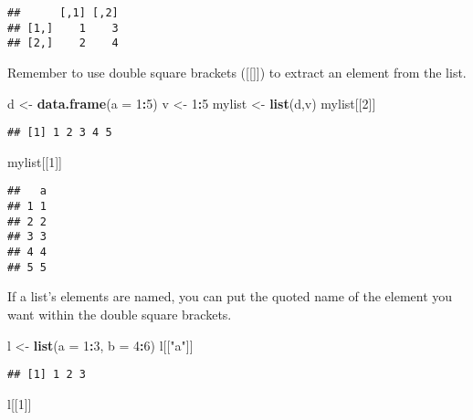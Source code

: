 \documentclass[
]{article}
\newenvironment{Shaded}{\begin{snugshade}}{\end{snugshade}}
\newcommand{\DataTypeTok}[1]{\textcolor[rgb]{0.13,0.29,0.53}{#1}}
\newcommand{\DecValTok}[1]{\textcolor[rgb]{0.00,0.00,0.81}{#1}}
\newcommand{\KeywordTok}[1]{\textcolor[rgb]{0.13,0.29,0.53}{\textbf{#1}}}
\newcommand{\NormalTok}[1]{#1}
\newcommand{\OperatorTok}[1]{\textcolor[rgb]{0.81,0.36,0.00}{\textbf{#1}}}
\newcommand{\StringTok}[1]{\textcolor[rgb]{0.31,0.60,0.02}{#1}}
\begin{document}
\begin{verbatim}
##      [,1] [,2]
## [1,]    1    3
## [2,]    2    4
\end{verbatim}

Remember to use double square brackets ({[}{[}{]}{]}) to extract an
element from the list.

\begin{Shaded}
\begin{Highlighting}[]
\NormalTok{d <-}\StringTok{ }\KeywordTok{data.frame}\NormalTok{(}\DataTypeTok{a =} \DecValTok{1}\OperatorTok{:}\DecValTok{5}\NormalTok{)}
\NormalTok{v <-}\StringTok{ }\DecValTok{1}\OperatorTok{:}\DecValTok{5}
\NormalTok{mylist <-}\StringTok{ }\KeywordTok{list}\NormalTok{(d,v)}
\NormalTok{mylist[[}\DecValTok{2}\NormalTok{]]}
\end{Highlighting}
\end{Shaded}

\begin{verbatim}
## [1] 1 2 3 4 5
\end{verbatim}

\begin{Shaded}
\begin{Highlighting}[]
\NormalTok{mylist[[}\DecValTok{1}\NormalTok{]]}
\end{Highlighting}
\end{Shaded}

\begin{verbatim}
##   a
## 1 1
## 2 2
## 3 3
## 4 4
## 5 5
\end{verbatim}

If a list's elements are named, you can put the quoted name of the
element you want within the double square brackets.

\begin{Shaded}
\begin{Highlighting}[]
\NormalTok{l <-}\StringTok{ }\KeywordTok{list}\NormalTok{(}\DataTypeTok{a =} \DecValTok{1}\OperatorTok{:}\DecValTok{3}\NormalTok{, }\DataTypeTok{b =} \DecValTok{4}\OperatorTok{:}\DecValTok{6}\NormalTok{)}
\NormalTok{l[[}\StringTok{"a"}\NormalTok{]]}
\end{Highlighting}
\end{Shaded}

\begin{verbatim}
## [1] 1 2 3
\end{verbatim}

\begin{Shaded}
\begin{Highlighting}[]
\NormalTok{l[[}\DecValTok{1}\NormalTok{]]}
\end{Highlighting}
\end{Shaded}
\end{document}
